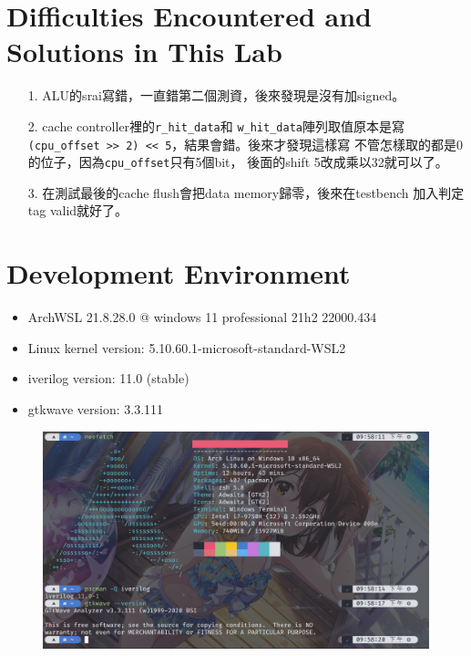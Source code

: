 \documentclass{article}
\begin{document}
\pagebreak

\section*{Difficulties Encountered and Solutions in This Lab}

\begin{enumerate}
    \item[1.] ALU的srai寫錯，一直錯第二個測資，後來發現是沒有加signed。
    \item[2.] cache controller裡的\texttt{r_hit_data}和
        \texttt{w_hit_data}陣列取值原本是寫
        \texttt{(cpu_offset >> 2) << 5}，結果會錯。後來才發現這樣寫
        不管怎樣取的都是0的位子，因為\texttt{cpu_offset}只有5個bit，
        後面的shift 5改成乘以32就可以了。
    \item[3.] 在測試最後的cache flush會把data memory歸零，後來在testbench
        加入判定tag valid就好了。
\end{enumerate}

\section*{Development Environment}

\begin{itemize}
    \item ArchWSL 21.8.28.0 @ windows 11 professional 21h2 22000.434
    \item Linux kernel version: 5.10.60.1-microsoft-standard-WSL2
    \item iverilog version: 11.0 (stable)
    \item gtkwave version: 3.3.111
\end{itemize}

\begin{figure}[h]
  \centering
  \includegraphics[width=\textwidth]{2.png}
\end{figure}
\end{document}
